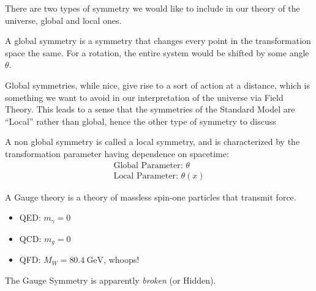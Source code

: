 There are two types of symmetry we would like to include in our theory of the universe, global and local ones.
\begin{definition}
  A global symmetry is a symmetry that changes every point in the transformation space the same. For a rotation, the entire system would be shifted by some angle $\theta$.
\end{definition}
Global symmetries, while nice, give rise to a sort of action at a distance, which is something we want to avoid in our interpretation of the universe via Field Theory. This leads to a sense that the symmetries of the Standard Model are ``Local'' rather than global, hence the other type of symmetry to discuss
\begin{definition}
  A non global symmetry is called a local symmetry, and is characterized by the transformation parameter having dependence on spacetime:
  \begin{gather*}
    \text{Global Parameter: }\theta\\
    \text{Local  Parameter: }\theta(x)
  \end{gather*}
\end{definition}

A Gauge theory is a theory of massless spin-one particles that transmit force.
\begin{itemize}
\item QED: $m_\gamma=0$
\item QCD: $m_g=0$
\item QFD: $M_W=\SI{80.4}{\GeV}$, whoops!
\end{itemize}
The Gauge Symmetry is apparently \emph{broken} (or Hidden).

